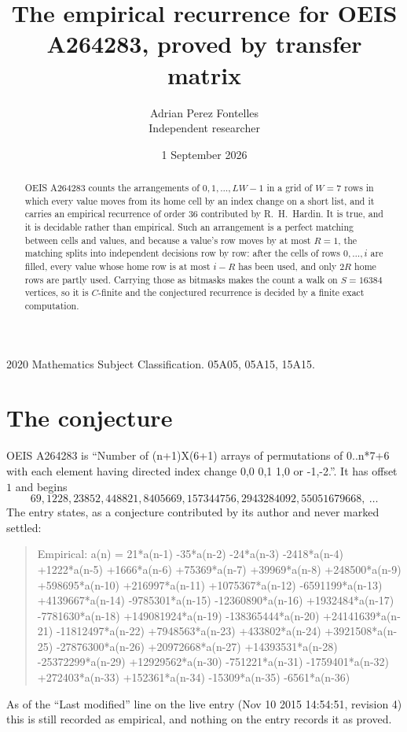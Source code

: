 \documentclass[11pt,a4paper]{article}
\title{The empirical recurrence for OEIS A264283, proved by transfer matrix}
\author{Adrian Perez Fontelles\\ \small Independent researcher}
\date{1 September 2026}
\theoremstyle{plain}
\theoremstyle{definition}
\begin{document}
\maketitle

\begin{abstract}
OEIS A264283 counts the arrangements of $0,1,\dots,LW-1$ in a grid of $W=7$ rows in which
every value moves from its home cell by an index change on a short list, and it carries an
empirical recurrence of order $36$ contributed by R.~H.~Hardin. It is true, and it is
decidable rather than empirical. Such an arrangement is a perfect matching between cells and
values, and because a value's row moves by at most $R=1$, the matching splits into
independent decisions row by row: after the cells of rows $0,\dots,i$ are filled,
every value whose home row is at most $i-R$ has been used, and only $2R$ home rows are
partly used. Carrying those as bitmasks makes the count a walk on $S=16384$ vertices, so it is
$C$-finite and the conjectured recurrence is decided by a finite exact computation.
\end{abstract}

\noindent\small 2020 Mathematics Subject Classification. 05A05, 05A15, 15A15.\normalsize

\section{The conjecture}

OEIS A264283 is ``Number of (n+1)X(6+1) arrays of permutations of 0..n*7+6 with each element having directed index change 0,0 0,1 1,0 or -1,-2.''. It has offset $1$ and begins
\[
69, 1228, 23852, 448821, 8405669, 157344756, 2943284092, 55051679668,\ \dots
\]
The entry states, as a conjecture contributed by its author and never marked settled:
\begin{quote}
Empirical: a(n) = 21*a(n-1) -35*a(n-2) -24*a(n-3) -2418*a(n-4) +1222*a(n-5) +1666*a(n-6) +75369*a(n-7) +39969*a(n-8) +248500*a(n-9) +598695*a(n-10) +216997*a(n-11) +1075367*a(n-12) -6591199*a(n-13) +4139667*a(n-14) -9785301*a(n-15) -12360890*a(n-16) +1932484*a(n-17) -7781630*a(n-18) +149081924*a(n-19) -138365444*a(n-20) +24141639*a(n-21) -11812497*a(n-22) +7948563*a(n-23) +433802*a(n-24) +3921508*a(n-25) -27876300*a(n-26) +20972668*a(n-27) +14393531*a(n-28) -25372299*a(n-29) +12929562*a(n-30) -751221*a(n-31) -1759401*a(n-32) +272403*a(n-33) +152361*a(n-34) -15309*a(n-35) -6561*a(n-36)
\end{quote}
As of the ``Last modified'' line on the live entry (Nov 10 2015 14:54:51, revision 4) this is still
recorded as empirical, and nothing on the entry records it as proved.
\end{document}
